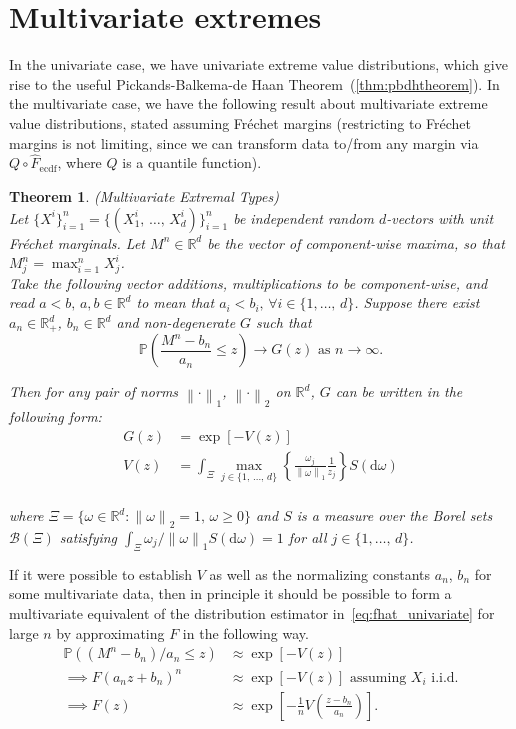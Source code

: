 \documentclass[11pt,twoside,openany]{book}
\newcommand{\norm}[1]{\left\lVert#1\right\rVert}
\newcommand{\prob}{\mathbb{P}}
\newcommand{\md}{\mathrm{d}}
\newcommand{\reals}{\mathbb{R}}
\newtheorem{Theorem}{Theorem}
\numberwithin{Theorem}{chapter}
\numberwithin{Definition}{chapter}
\numberwithin{Lemma}{chapter}
\numberwithin{Algorithm}{chapter}
\numberwithin{equation}{chapter}
\begin{document}
\section{Multivariate extremes}

In the univariate case, we have univariate extreme value distributions,
which give rise to the useful Pickands-Balkema-de Haan Theorem~(\ref{thm:pbdhtheorem}).
In the multivariate case, we have the following result about
multivariate extreme value distributions, stated assuming Fréchet margins
(restricting to Fréchet margins is not limiting, since we can
transform data to/from any margin via $ Q \circ \hat F_{\text{ecdf}}$, where $Q$ is a
quantile function).


\begin{Theorem}{(Multivariate Extremal Types)}\label{thm:mvextypes}\\
  Let $\{X^i\}_{i=1}^n=\{(X^i_1,\,\ldots,\,X^i_d)\}_{i=1}^n$ be independent
  random $d$-vectors with unit Fréchet marginals. Let $M^n\in \mathbb{R}^d$ be
  the vector of component-wise maxima, so that $M^n_j = \max_{i=1}^n
  X^i_j$.\\

  Take the following vector additions, multiplications to be component-wise,
  and read $a<b,\,a,b\in\mathbb{R}^d$ to mean that $a_i < b_i,\,\forall
  i\in\{1,\ldots,\,d\}$.
  Suppose there exist $a_n \in \mathbb{R}_{+}^d$, $b_n\in\mathbb{R}^d$ and
  non-degenerate $G$ such that
  \[
    \mathbb{P}\left(\frac{M^n - b_n}{a_n}\leq z\right)\rightarrow G(z) \text{ as } {n\rightarrow \infty}.
  \]

  Then for any pair of norms $\norm{\cdot}_1$, $\norm{\cdot}_2$ on $\reals^d$, $G$ can be
  written in the following form:
  \[
  \begin{aligned}
    G(z) &= \exp\left[-V(z)\right]\\
    V(z) &= \int_{\Xi} \max_{j\in\{1,\,\ldots,\,d\}}\left\{\frac{\omega_j}{\norm{\omega}_1}\frac{1}{z_j}\right\} S(\md \omega)\\
  \end{aligned}
  \]

  where $\Xi = \{\omega\in\reals^d : \norm{\omega}_2 = 1,\,\omega \geq 0\}$ and
  $S$ is a measure over the Borel sets $\mathcal{B}(\Xi)$ satisfying
  $\int_{\Xi}\omega_j/\norm{\omega}_1 S(\md \omega)=1$ for all
  $j\in\{1,\ldots,\,d\}$.
\end{Theorem}

If it were possible to establish $V$ as well as the normalizing constants
$a_n$, $b_n$ for some multivariate
data, then
in principle it should be possible to form a multivariate equivalent
of the distribution estimator in~\eqref{eq:fhat_univariate} for large $n$
by approximating $F$ in the following way.
\[
  \begin{aligned}
  \prob((M^n -  b_n)/ a_n\leq  z) &\approx \exp\left[-V( z)\right]\\
    \implies F(a_n  z +  b_n)^n &\approx \exp\left[-V( z)\right] \text{ assuming $X_i$ i.i.d.}\\
    \implies F(  z ) &\approx \exp\left[-\frac{1}{n}V\left(\frac{z - b_n}{a_n} \right)\right].\\
  \end{aligned}
\]
\end{document}
